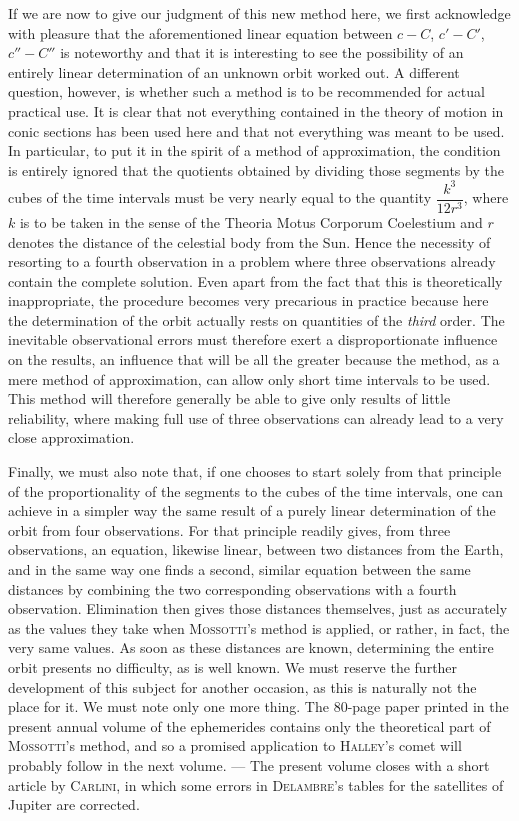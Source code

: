 If we are now to give our judgment of this new method here, we first acknowledge with pleasure that the aforementioned linear equation between $c-C$, $c'-C'$, $c''-C''$ is noteworthy and that it is interesting to see the possibility of an entirely linear determination of an unknown orbit worked out. A different question, however, is whether such a method is to be recommended for actual practical use. It is clear that not everything contained in the theory of motion in conic sections has been used here and that not everything was meant to be used. In particular, to put it in the spirit of a method of approximation, the condition is entirely ignored that the quotients obtained by dividing those segments by the cubes of the time intervals must be very nearly equal to the quantity $\dfrac{k^3}{12r^3}$, where $k$ is to be taken in the sense of the Theoria Motus Corporum Coelestium and $r$ denotes the distance of the celestial body from the Sun. Hence the necessity of resorting to a fourth observation in a problem where three observations already contain the complete solution. Even apart from the fact that this is theoretically inappropriate, the procedure becomes very precarious in practice because here the determination of the orbit actually rests on quantities of the \emph{third} order. The inevitable observational errors must therefore exert a disproportionate influence on the results, an influence that will be all the greater because the method, as a mere method of approximation, can allow only short time intervals to be used. This method will therefore generally be able to give only results of little reliability, where making full use of three observations can already lead to a very close approximation.

Finally, we must also note that, if one chooses to start solely from that principle of the proportionality of the segments to the cubes of the time intervals, one can achieve in a simpler way the same result of a purely linear determination of the orbit from four observations. For that principle readily gives, from three observations, an equation, likewise linear, between two distances from the Earth, and in the same way one finds a second, similar equation between the same distances by combining the two corresponding observations with a fourth observation. Elimination then gives those distances themselves, just as accurately as the values they take when \textsc{Mossotti}’s method is applied, or rather, in fact, the very same values. As soon as these distances are known, determining the entire orbit presents no difficulty, as is well known. We must reserve the further development of this subject for another occasion, as this is naturally not the place for it. We must note only one more thing. The 80-page paper printed in the present annual volume of the ephemerides contains only the theoretical part of \textsc{Mossotti}’s method, and so a promised application to \textsc{Halley}’s comet will probably follow in the next volume. --- The present volume closes with a short article by \textsc{Carlini}, in which some errors in \textsc{Delambre}’s tables for the satellites of Jupiter are corrected.
\par\clearpage\endgroup
